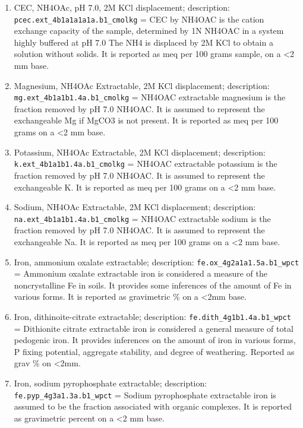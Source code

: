 \documentclass[
  graybox,natbib,nospthms]{svmono}
\begin{document}
\begin{enumerate}
\item
  CEC, NH4OAc, pH 7.0, 2M KCl displacement; description: \texttt{pcec.ext\_4b1a1a1a1a.b1\_cmolkg} = CEC by NH4OAC is the cation exchange capacity of the sample, determined by 1N NH4OAC in a system highly buffered at pH 7.0 The NH4 is displaced by 2M KCl to obtain a solution without solids. It is reported as meq per 100 grams sample, on a \textless2 mm base.\\
\item
  Magnesium, NH4OAc Extractable, 2M KCl displacement; description: \texttt{mg.ext\_4b1a1b1.4a.b1\_cmolkg} = NH4OAC extractable magnesium is the fraction removed by pH 7.0 NH4OAC. It is assumed to represent the exchangeable Mg if MgCO3 is not present. It is reported as meq per 100 grams on a \textless2 mm base.\\
\item
  Potassium, NH4OAc Extractable, 2M KCl displacement; description: \texttt{k.ext\_4b1a1b1.4a.b1\_cmolkg} = NH4OAC extractable potassium is the fraction removed by pH 7.0 NH4OAC. It is assumed to represent the exchangeable K. It is reported as meq per 100 grams on a \textless2 mm base.\\
\item
  Sodium, NH4OAc Extractable, 2M KCl displacement; description: \texttt{na.ext\_4b1a1b1.4a.b1\_cmolkg} = NH4OAC extractable sodium is the fraction removed by pH 7.0 NH4OAC. It is assumed to represent the exchangeable Na. It is reported as meq per 100 grams on a \textless2 mm base.\\
\item
  Iron, ammonium oxalate extractable; description: \texttt{fe.ox\_4g2a1a1.5a.b1\_wpct} = Ammonium oxalate extractable iron is considered a measure of the noncrystalline Fe in soils. It provides some inferences of the amount of Fe in various forms. It is reported as gravimetric \% on a \textless2mm base.\\
\item
  Iron, dithinoite-citrate extractable; description: \texttt{fe.dith\_4g1b1.4a.b1\_wpct} = Dithionite citrate extractable iron is considered a general measure of total pedogenic iron. It provides inferences on the amount of iron in various forms, P fixing potential, aggregate stability, and degree of weathering. Reported as grav \% on \textless2mm.\\
\item
  Iron, sodium pyrophosphate extractable; description: \texttt{fe.pyp\_4g3a1.3a.b1\_wpct} = Sodium pyrophosphate extractable iron is assumed to be the fraction associated with organic complexes. It is reported as gravimetric percent on a \textless2 mm base.\\

\end{enumerate}
\end{document}
